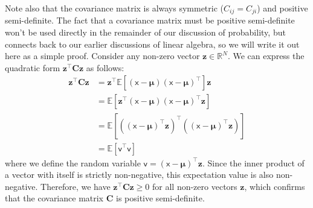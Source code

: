 Note also that the covariance matrix is always symmetric ($C_{ij} = C_{ji}$) and positive semi-definite. The fact that a covariance matrix must be positive semi-definite won't be used directly in the remainder of our discussion of probability, but connects back to our earlier discussions of linear algebra, so we will write it out here as a simple proof. Consider any non-zero vector $\mathbf{z} \in \mathbb{R}^N$. We can express the quadratic form $\mathbf{z}^\top \mathbf{C} \mathbf{z}$ as follows:
\begin{align}
    \mathbf{z}^\top \mathbf{C} \mathbf{z} &= \mathbf{z}^\top\mathbb{E}[ (\boldsymbol{\mathsf{x}} - \boldsymbol \mu) (\boldsymbol{\mathsf{x}} - \boldsymbol \mu)^\top ] \mathbf{z} \\
    &= \mathbb{E}[ \mathbf{z}^\top (\boldsymbol{\mathsf{x}} - \boldsymbol \mu) (\boldsymbol{\mathsf{x}} - \boldsymbol \mu)^\top  \mathbf{z} ] \\
    &= \mathbb{E}[ ( (\boldsymbol{\mathsf{x}} - \boldsymbol \mu)^\top \mathbf{z} )^\top ( (\boldsymbol{\mathsf{x}} - \boldsymbol \mu)^\top \mathbf{z} ) ] \\
    &= \mathbb{E}[ \boldsymbol{\mathsf{v}}^\top \boldsymbol{\mathsf{v}} ] 
\end{align}
where we define the random variable $\boldsymbol{\mathsf{v}} = (\boldsymbol{\mathsf{x}} - \boldsymbol \mu)^\top \mathbf{z}$. Since the inner product of a vector with itself is strictly non-negative, this expectation value is also non-negative. Therefore, we have $\mathbf{z}^\top \mathbf{C} \mathbf{z} \geq 0$ for all non-zero vectors $\mathbf{z}$, which confirms that the covariance matrix $\mathbf{C}$ is positive semi-definite.

